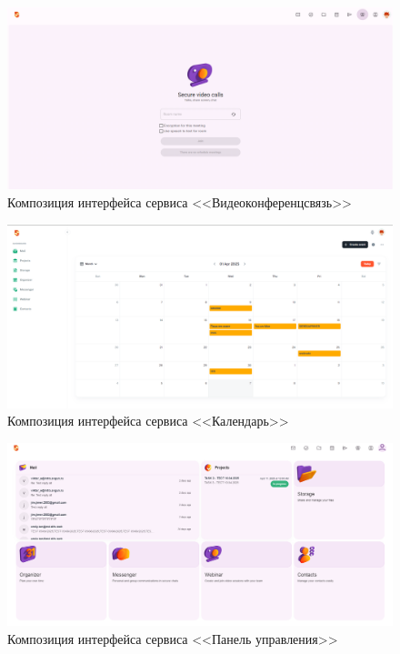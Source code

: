 \begin{figure}[ht]
	\centering
	\includegraphics[width=1\linewidth]{images/вкс}
	\caption{Композиция интерфейса сервиса <<Видеоконференцсвязь>>}
	\label{templ:image2}
\end{figure}

\begin{figure}[ht]
	\centering
	\includegraphics[width=1\linewidth]{images/календарь}
	\caption{Композиция интерфейса сервиса <<Календарь>>}
	\label{templ:image3}
\end{figure}

\begin{figure}[ht]
	\centering
	\includegraphics[width=1\linewidth]{images/дашборд}
	\caption{Композиция интерфейса сервиса <<Панель управления>>}
	\label{templ:image4}
\end{figure}

